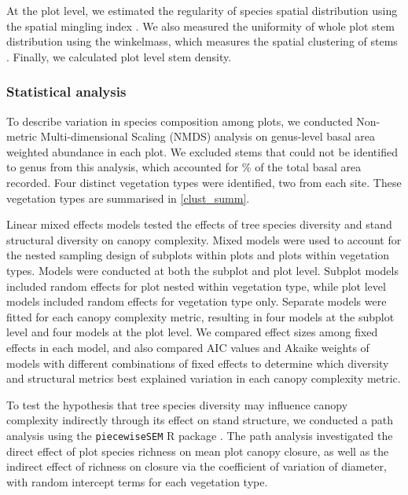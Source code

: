 \documentclass[11pt,a4paper]{article}
\begin{document}
At the plot level, we estimated the regularity of species spatial distribution using the spatial mingling index \citep{Gadow2002}. We also measured the uniformity of whole plot stem distribution using the winkelmass, which measures the spatial clustering of stems \citep{Gadow2002}. Finally, we calculated plot level stem density.

\subsubsection{Statistical analysis}

To describe variation in species composition among plots, we conducted Non-metric Multi-dimensional Scaling (NMDS) analysis on genus-level basal area weighted abundance in each plot. We excluded stems that could not be identified to genus from this analysis, which accounted for \perIndet{}\% of the total basal area recorded. Four distinct vegetation types were identified, two from each site. These vegetation types are summarised in \autoref{clust_summ}.

Linear mixed effects models tested the effects of tree species diversity and stand structural diversity on canopy complexity. Mixed models were used to account for the nested sampling design of subplots within plots and plots within vegetation types. Models were conducted at both the subplot and plot level. Subplot models included random effects for plot nested within vegetation type, while plot level models included random effects for vegetation type only. Separate models were fitted for each canopy complexity metric, resulting in four models at the subplot level and four models at the plot level. We compared effect sizes among fixed effects in each model, and also compared AIC values and Akaike weights of models with different combinations of fixed effects to determine which diversity and structural metrics best explained variation in each canopy complexity metric. 

To test the hypothesis that tree species diversity may influence canopy complexity indirectly through its effect on stand structure, we conducted a path analysis using the \texttt{piecewiseSEM} R package \citep{}. The path analysis investigated the direct effect of plot species richness on mean plot canopy closure, as well as the indirect effect of richness on closure via the coefficient of variation of diameter, with random intercept terms for each vegetation type.


\end{document}
